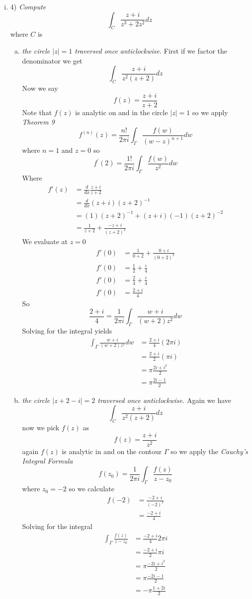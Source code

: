 \documentclass[11pt]{article}
\begin{document}
\begin{enumerate}
\begin{enumerate}[(i)]
\item 4)
\textit{Compute}
$$\int_C \frac{z+i}{z^3+2z^2}dz$$
where $C$ is
\begin{enumerate}[(a)]
\item\textit{the circle $|z|=1$ traversed once anticlockwise.}
First if we factor the denominator we get
$$\int_C \frac{z+i}{z^2(z+2)}dz$$
Now we say
$$f(z) = \frac{z+i}{z+2}$$
Note that $f(z)$ is analytic on and in the circle $|z|=1$ so we apply \emph{Theorem 9}
$$f^{(n)}(z)=\frac{n!}{2\pi i}\int_{\Gamma}\frac{f(w)}{(w-z)^{n+1}}dw$$
where $n=1$ and $z=0$ so
$$f^{'}(2)=\frac{1!}{2\pi i}\int_{\Gamma}\frac{f(w)}{z^{2}}dw$$
Where
\begin{align*}
f'(z) &= \frac{d}{dx}\frac{z+i}{z+2}\\
&= \frac{d}{dx}(z+i)(z+2)^{-1}\\
&= (1)(z+2)^{-1}+(z+i)(-1)(z+2)^{-2}\\
&= \frac{1}{z+2}+\frac{-z+i}{(z+2)^{2}}
\end{align*}
We evaluate at $z=0$
\begin{align*}
f'(0) &= \frac{1}{0+2}+\frac{0+i}{(0+2)^{2}}\\
f'(0) &= \frac{1}{2}+\frac{i}{4}\\
f'(0) &= \frac{2}{4}+\frac{i}{4}\\
f'(0) &= \frac{2+i}{4}
\end{align*}
So
$$\frac{2+i}{4}=\frac{1}{2\pi i}\int_{\Gamma}\frac{w+i}{(w+2)z^2}dw$$
Solving for the integral yields
\begin{align*}
\int_{\Gamma}\frac{w+i}{(w+2)z^2}dw &= \frac{2+i}{4}(2\pi i)\\
 &= \frac{2+i}{2}(\pi i)\\
 &= \pi\frac{2i+i^2}{2}\\
 &= \pi\frac{2i-1}{2}
\end{align*}

\item\textit{the circle $|z+2-i|=2$ traversed once anticlockwise.}
Again we have
$$\int_C \frac{z+i}{z^2(z+2)}dz$$
now we pick $f(z)$ as
$$f(z) = \frac{z+i}{z^2}$$
again $f(z)$ is analytic in and on the contour $\Gamma$ so we apply the \emph{Cauchy's Integral Formula} 
$$f(z_0) = \frac{1}{2\pi i}\int_{\Gamma}\frac{f(z)}{z-z_0}$$
where $z_0=-2$ so we calculate
\begin{align*}
f(-2) &= \frac{-2+i}{(-2)^2}\\
&= \frac{-2+i}{4}
\end{align*}
Solving for the integral 
\begin{align*}
\int_{\Gamma}\frac{f(z)}{z-z_0} &= \frac{-2+i}{4}{2\pi i}\\
&= \frac{-2+i}{2}{\pi i}\\
&= \pi\frac{-2i+i^2}{2}\\
&= \pi\frac{-2i-1}{2}\\
&= -\pi\frac{1+2i}{2}
\end{align*}


\end{enumerate}
\end{enumerate}
\end{enumerate}
\end{document}
